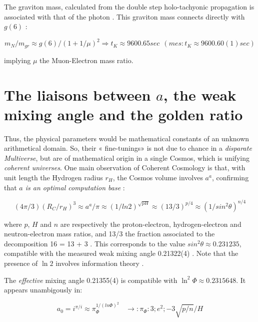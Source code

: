 \documentclass[a4paper,9pt]{article}
\begin{document}
The graviton mass, calculated from the double step holo-tachyonic propagation is associated with that of the photon \cite{Sanchez}. This graviton mass connects directly with $g(6)$ :

\begin{equation}
m_N/m_{gr} \approx g(6)/(1+1/\mu)^2 \Rightarrow    t_K  \approx  9600.65 sec ~~(mes : t_K \approx 9600.60(1) sec)    
\end{equation}

implying $\mu$ the  Muon-Electron mass ratio. 

  
   

\section{The liaisons between $a$, the weak mixing angle and the golden ratio}

Thus, the physical parameters would be mathematical constants of an unknown arithmetical domain. So, their « fine-tunings» is not due to chance in a \textit {disparate Multiverse}, but are of mathematical origin in a single Cosmos, which is unifying \textit{coherent universes}. One main observation of Coherent Cosmology is that, with unit length the Hydrogen radius $r_H$, the Cosmos volume involves $a^a$, confirming that \textit{$a$ is an optimal computation base}  \cite{Sanchez}:

\begin{equation}
    (4\pi /3) (R_C/r_H)^3 \approx a^a/\pi \approx (1/ln2)^{\sqrt{pH}} \approx (13/3)^{p/4} \approx (1/sin^2\theta)^{n/4} 
\end{equation}

where $p$, $H$ and $n$ are respectively the proton-electron, hydrogen-electron and neutron-electron mass ratios, and 13/3 the fraction associated to the decomposition 16 = 13 + 3 \cite{Sanchez1}. This corresponds to the value $sin^2\theta \approx 0.231235$, compatible with the measured weak mixing angle 0.21322(4) \cite{Tanabashi}. Note that the presence of $\ln{2}$ involves information theory \cite{Shannon}. 


The \textit {effective} mixing angle 0.21355(4) \cite{Tanabashi} is compatible with $\ln^2{\Phi} \approx 0.2315648$. It appears unambigously in:

\begin{equation}
a_0 = i^{\pi/i} \approx \pi_{\Phi}^{1/(ln\Phi) ^2} ~~~~\rightarrow : \pi_{\Phi}: 3; e^2; -3\sqrt{p/n}/H
\end{equation}
\end{document}
